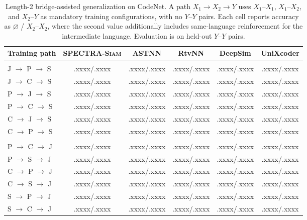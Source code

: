 \documentclass[final,5p,times,twocolumn]{elsarticle}
\newcommand{\method}{\textsc{SPECTRA-Siam}}
\theoremstyle{plain}
\begin{document}
\begin{table}[!htbp]
\centering
\caption{Length-2 bridge-assisted generalization on CodeNet. A path $X_1\!\rightarrow X_2\!\rightarrow Y$ uses $X_1$--$X_1$, $X_1$--$X_2$, and $X_2$--$Y$ as mandatory training configurations, with no $Y$--$Y$ pairs. Each cell reports accuracy as
$\varnothing$ / $X_2$--$X_2$, where the second value additionally includes same-language reinforcement for the intermediate language. Evaluation is on held-out $Y$--$Y$ pairs.}
\label{tab:rq3_bridge_l2}

\tiny
\setlength{\tabcolsep}{6.4pt}
\renewcommand{\arraystretch}{1.2}

\begin{adjustbox}{width=0.95\columnwidth}
\begin{tabular}{@{}lccccc@{}}
\toprule
\textbf{Training path}
& \textbf{\method{}}
& \textbf{ASTNN}
& \textbf{RtvNN}
& \textbf{DeepSim}
& \textbf{UniXcoder} \\
\midrule

\rowcolor{black!7}
\multicolumn{6}{@{}l}{\textit{Target C\# (S)}} \\

J $\rightarrow$ P $\rightarrow$ S
& .xxxx/.xxxx & .xxxx/.xxxx & .xxxx/.xxxx & .xxxx/.xxxx & .xxxx/.xxxx \\
J $\rightarrow$ C $\rightarrow$ S
& .xxxx/.xxxx & .xxxx/.xxxx & .xxxx/.xxxx & .xxxx/.xxxx & .xxxx/.xxxx \\
P $\rightarrow$ J $\rightarrow$ S
& .xxxx/.xxxx & .xxxx/.xxxx & .xxxx/.xxxx & .xxxx/.xxxx & .xxxx/.xxxx \\
P $\rightarrow$ C $\rightarrow$ S
& .xxxx/.xxxx & .xxxx/.xxxx & .xxxx/.xxxx & .xxxx/.xxxx & .xxxx/.xxxx \\
C $\rightarrow$ J $\rightarrow$ S
& .xxxx/.xxxx & .xxxx/.xxxx & .xxxx/.xxxx & .xxxx/.xxxx & .xxxx/.xxxx \\
C $\rightarrow$ P $\rightarrow$ S
& .xxxx/.xxxx & .xxxx/.xxxx & .xxxx/.xxxx & .xxxx/.xxxx & .xxxx/.xxxx \\

\addlinespace[1pt]
\rowcolor{black!7}
\multicolumn{6}{@{}l}{\textit{Target Java (J)}} \\

P $\rightarrow$ C $\rightarrow$ J
& .xxxx/.xxxx & .xxxx/.xxxx & .xxxx/.xxxx & .xxxx/.xxxx & .xxxx/.xxxx \\
P $\rightarrow$ S $\rightarrow$ J
& .xxxx/.xxxx & .xxxx/.xxxx & .xxxx/.xxxx & .xxxx/.xxxx & .xxxx/.xxxx \\
C $\rightarrow$ P $\rightarrow$ J
& .xxxx/.xxxx & .xxxx/.xxxx & .xxxx/.xxxx & .xxxx/.xxxx & .xxxx/.xxxx \\
C $\rightarrow$ S $\rightarrow$ J
& .xxxx/.xxxx & .xxxx/.xxxx & .xxxx/.xxxx & .xxxx/.xxxx & .xxxx/.xxxx \\
S $\rightarrow$ P $\rightarrow$ J
& .xxxx/.xxxx & .xxxx/.xxxx & .xxxx/.xxxx & .xxxx/.xxxx & .xxxx/.xxxx \\
S $\rightarrow$ C $\rightarrow$ J
& .xxxx/.xxxx & .xxxx/.xxxx & .xxxx/.xxxx & .xxxx/.xxxx & .xxxx/.xxxx \\


\end{tabular}
\end{adjustbox}
\end{table}
\end{document}
